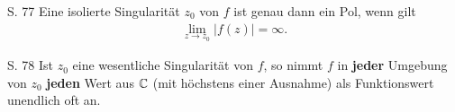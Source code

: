 \begin{satz}[]{S. 77}
  \label{satz:7_4}
  Eine isolierte Singularität $z_0$ von $f$ ist genau dann ein Pol, wenn gilt
  \begin{align}
    \lim_{z \to z_0} |f(z)| = \infty .
  \end{align}
\end{satz}

\begin{satz}{S. 78}
  \label{satz:7_5}
  Ist $z_0$ eine wesentliche Singularität von $f$, so nimmt $f$ in \textbf{jeder} Umgebung von $z_0$ \textbf{jeden} Wert aus $\mathbb{C}$ (mit höchstens einer Ausnahme) als Funktionswert unendlich oft an.
\end{satz}
